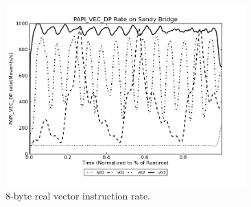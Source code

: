 \begin{figure}
\begin{minipage}{1.\textwidth}
   \begin{center}
   \includegraphics[width=1.\linewidth,height=7cm]{figures/chem-PAPI_VEC_DP.png}
   \caption{8-byte real vector instruction rate.}
   \end{center}
\end{minipage}
\end{figure}





